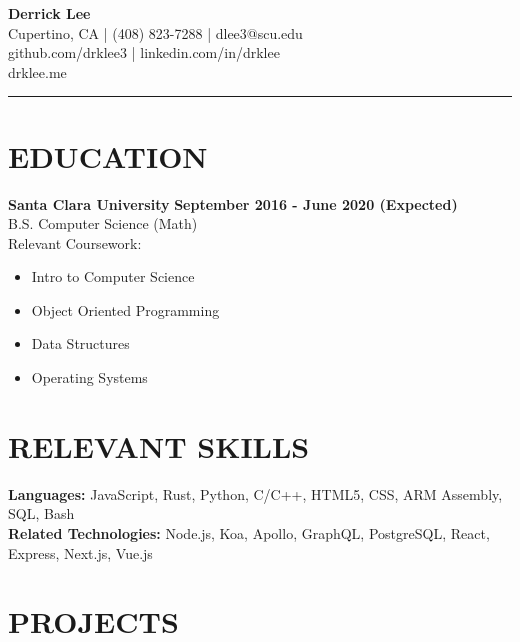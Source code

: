 \documentclass{res}
\begin{document}
	\thispagestyle{empty} %
	\begin{multicols}{2}
		\vfill\null
		{\bf \huge{Derrick Lee}} \\
		
		\hspace*{\fill} {Cupertino, CA | (408) 823-7288 | dlee3@scu.edu} \\
		\hspace*{\fill} {github.com/drklee3 | linkedin.com/in/drklee} \\
		\hspace*{\fill} {drklee.me} \\
	\end{multicols}
	\vspace{-10mm}
	\noindent\rule{\textwidth}{1pt}
	
	\begin{resume}

		\section{EDUCATION}

		{\bf Santa Clara University} \hfill {\bf September 2016 - June 2020 (Expected)} \\
			B.S. Computer Science (Math) \\
			Relevant Coursework:
			\vspace{-3.5mm}
			\begin{multicols}{2}
			\begin{itemize} \itemsep -2pt
				\item Intro to Computer Science
				\item Object Oriented Programming
				\item Data Structures
				\item Operating Systems
			\end{itemize}
			\end{multicols}
		
		\section{RELEVANT SKILLS}
		\vspace{6pt}

			{\bf Languages:} JavaScript, Rust, Python, C/C++, HTML5, CSS, ARM Assembly, SQL, Bash \\
			{\bf Related Technologies:} Node.js, Koa, Apollo, GraphQL, PostgreSQL, React, Express, Next.js, Vue.js

		\section{PROJECTS}
		\vspace{6pt}


\end{resume}
\end{document}
